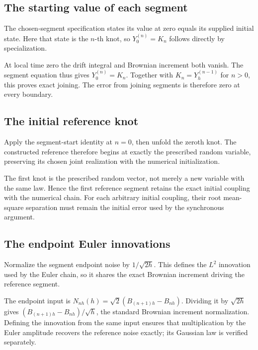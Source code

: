 \documentclass[11pt,a4paper]{article}
\begin{document}
\subsection{\texorpdfstring{The starting value of each segment}{The starting value of each segment}}


The chosen-segment specification states its value at zero equals its supplied initial state. Here that state is the \(n\)-th knot, so \(Y^{(n)}_0=K_n\) follows directly by specialization.



At local time zero the drift integral and Brownian increment both vanish. The segment equation thus gives \(Y^{(n)}_0=K_n\). Together with \(K_n=Y^{(n-1)}_h\) for \(n>0\), this proves exact joining. The error from joining segments is therefore zero at every boundary.


\subsection{\texorpdfstring{The initial reference knot}{The initial reference knot}}


Apply the segment-start identity at \(n=0\), then unfold the zeroth knot. The constructed reference therefore begins at exactly the prescribed random variable, preserving its chosen joint realization with the numerical initialization.



The first knot is the prescribed random vector, not merely a new variable with the same law. Hence the first reference segment retains the exact initial coupling with the numerical chain. For each arbitrary initial coupling, their root mean-square separation must remain the initial error used by the synchronous argument.


\subsection{\texorpdfstring{The endpoint Euler innovations}{The endpoint Euler innovations}}


Normalize the segment endpoint noise by \(1/\sqrt{2h}\). This defines the \(L^2\) innovation used by the Euler chain, so it shares the exact Brownian increment driving the reference segment.



The endpoint input is \(N_{nh}(h)=\sqrt2(B_{(n+1)h}-B_{nh})\). Dividing it by \(\sqrt{2h}\) gives \((B_{(n+1)h}-B_{nh})/\sqrt h\), the standard Brownian increment normalization. Defining the innovation from the same input ensures that multiplication by the Euler amplitude recovers the reference noise exactly; its Gaussian law is verified separately.
\end{document}
